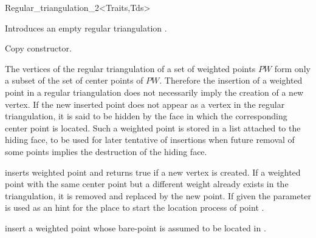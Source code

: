 \begin{ccRefClass}{Regular_triangulation_2<Traits,Tds>}

\ccInheritsFrom
{}

\ccTypes
{}
\ccThreeToTwo
{}

\ccGlue
{}
\ccGlue
{}
\ccGlue
{}
\ccGlue
{}


\ccCreation
{}  %

{Introduces an empty regular triangulation \ccVar.}

{Copy constructor.}



The vertices of the regular triangulation
of a set of weighted points ${  PW}$ form only a subset
of the set of center points of ${   PW}$.
Therefore the  insertion of a weighted point  in a regular triangulation
does not necessarily imply the creation of a new vertex.
If the new inserted point does not appear as a vertex in the
regular triangulation, it is said to be hidden 
by the face in which the corresponding center point is located.
Such a weighted point is stored in a list attached to the hiding face,
to be used for later tentative of insertions when future removal
of some points implies the destruction of the hiding face.



{inserts  weighted point  and 
returns true if a new vertex is created. 
If a weighted point with the same center point but a 
different weight already exists in the triangulation, 
it is removed and replaced by the new point.
If given the parameter  is used as an hint
for the place to start the location process of point .}


{insert a weighted point  whose bare-point is assumed to be
located in  .}


\end{ccRefClass}
